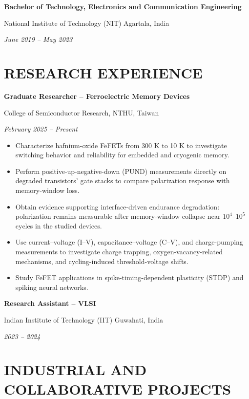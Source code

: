 \documentclass[10pt,a4paper]{article}
\newcommand{\entry}[3]{%
  \par\addvspace{4pt}%
  \needspace{4\baselineskip}%
  \textbf{#1}\par
  #2\par
  \textit{#3}\par
}
\begin{document}
\entry
  {Bachelor of Technology, Electronics and Communication Engineering}
  {National Institute of Technology (NIT) Agartala, India}
  {June 2019 -- May 2023}

\section{RESEARCH EXPERIENCE}

\entry
  {Graduate Researcher -- Ferroelectric Memory Devices}
  {College of Semiconductor Research, NTHU, Taiwan}
  {February 2025 -- Present}

\begin{itemize}
  \item Characterize hafnium-oxide FeFETs from 300 K to 10 K
        to investigate switching behavior and reliability
        for embedded and cryogenic memory.
  \item Perform positive-up-negative-down (PUND) measurements
        directly on degraded transistors' gate stacks to
        compare polarization response with memory-window loss.
  \item Obtain evidence supporting interface-driven endurance
        degradation: polarization remains measurable after
        memory-window collapse near $10^{4}$--$10^{5}$ cycles
        in the studied devices.
  \item Use current--voltage (I--V), capacitance--voltage (C--V),
        and charge-pumping measurements to investigate charge
        trapping, oxygen-vacancy-related mechanisms, and
        cycling-induced threshold-voltage shifts.
  \item Study FeFET applications in spike-timing-dependent
        plasticity (STDP) and spiking neural networks.
\end{itemize}

\entry
  {Research Assistant -- VLSI}
  {Indian Institute of Technology (IIT) Guwahati, India}
  {2023 -- 2024}

\section{INDUSTRIAL AND COLLABORATIVE PROJECTS}

\end{document}
